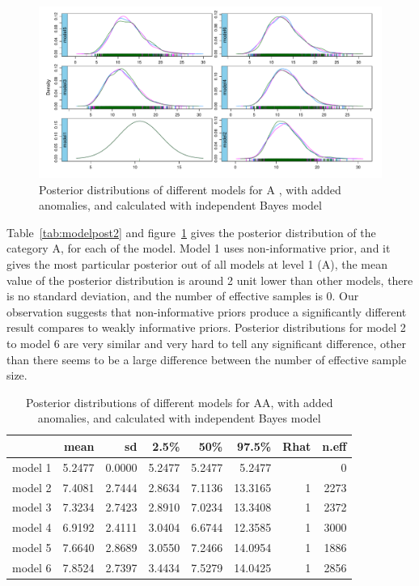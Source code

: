 \begin{figure}[!h]
	\centering
	\includegraphics[width=1\linewidth]{../../R-codes/JAGS/plots/findmodel/DensityA3abn}
	\caption{Posterior distributions of different models for A , with added anomalies, and calculated with independent Bayes model}
	\label{fig:densityA3abn}
\end{figure}

Table~\ref{tab:modelpost2} and figure~\ref{fig:densityA3abn} gives the posterior distribution of the category A, for each of the model. Model 1 uses non-informative prior, and it gives the most particular posterior out of all models at level 1 (A), the mean value of the posterior distribution is around 2 unit lower than other models, there is no standard deviation, and the number of effective samples is 0. Our observation suggests that non-informative priors produce a significantly different result compares to weakly informative priors. Posterior distributions for model 2 to model 6 are very similar and very hard to tell any significant difference, other than there seems to be a large difference between the number of effective sample size.

\newpage %
\begin{table}[!ht]
	\centering
	\begin{tabular}{rrrrrrrr}
		\hline
		& mean & sd & 2.5\% & 50\% & 97.5\% & Rhat & n.eff \\ 
		\hline
		model 1 & 5.2477 & 0.0000 & 5.2477 & 5.2477 & 5.2477 &  & 0 \\ 
		model 2 & 7.4081 & 2.7444 & 2.8634 & 7.1136 & 13.3165 & 1 & 2273 \\ 
		model 3 & 7.3234 & 2.7423 & 2.8910 & 7.0234 & 13.3408 & 1 & 2372 \\ 
		model 4 & 6.9192 & 2.4111 & 3.0404 & 6.6744 & 12.3585 & 1 & 3000 \\ 
		model 5 & 7.6640 & 2.8689 & 3.0550 & 7.2466 & 14.0954 & 1 & 1886 \\ 
		model 6 & 7.8524 & 2.7397 & 3.4434 & 7.5279 & 14.0425 & 1 & 2856 \\ 
		\hline
	\end{tabular}
	\caption{Posterior distributions of different models for AA, with added anomalies, and calculated with independent Bayes model} 
	\label{tab:modelpost3}
\end{table}

